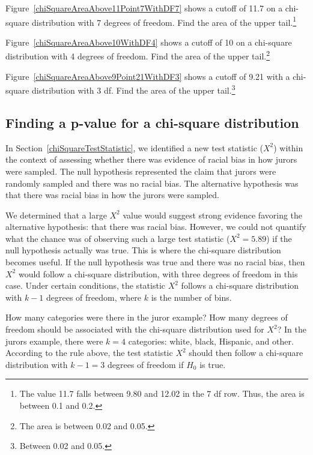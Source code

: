 \begin{exercise}
Figure~\ref{chiSquareAreaAbove11Point7WithDF7} shows a cutoff of 11.7 on a chi-square distribution with 7 degrees of freedom. Find the area of the upper tail.\footnote{The value 11.7 falls between 9.80 and 12.02 in the 7 df row. Thus, the area is between 0.1 and 0.2.}
\end{exercise}

\begin{exercise}
Figure~\ref{chiSquareAreaAbove10WithDF4} shows a cutoff of 10 on a chi-square distribution with 4 degrees of freedom. Find the area of the upper tail.\footnote{The area is between 0.02 and 0.05.}
\end{exercise}

\begin{exercise}
Figure~\ref{chiSquareAreaAbove9Point21WithDF3} shows a cutoff of 9.21 with a chi-square distribution with 3 df. Find the area of the upper tail.\footnote{Between 0.02 and 0.05.}
\end{exercise}


\subsection{Finding a p-value for a chi-square distribution}
\label{pValueForAChiSquareTest}

In Section~\ref{chiSquareTestStatistic}, we identified a new test statistic ($X^2$) within the context of assessing whether there was evidence of racial bias in how jurors were sampled. The null hypothesis represented the claim that jurors were randomly sampled and there was no racial bias. The alternative hypothesis was that there was racial bias in how the jurors were sampled.

We determined that a large $X^2$ value would suggest strong evidence favoring the alternative hypothesis: that there was racial bias. However, we could not quantify what the chance was of observing such a large test statistic ($X^2=5.89$) if the null hypothesis actually was true. This is where the chi-square distribution becomes useful. If the null hypothesis was true and there was no racial bias, then $X^2$ would follow a chi-square distribution, with three degrees of freedom in this case. Under certain conditions, the statistic $X^2$ follows a chi-square distribution with $k-1$ degrees of freedom, where $k$ is the number of bins.

\begin{example}{How many categories were there in the juror example? How many degrees of freedom should be associated with the chi-square distribution used for $X^2$?}
In the jurors example, there were $k=4$ categories: white, black, Hispanic, and other. According to the rule above, the test statistic $X^2$ should then follow a chi-square distribution with $k-1 = 3$ degrees of freedom if $H_0$ is true.
\end{example}

